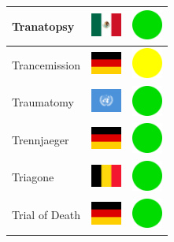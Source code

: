 \documentclass[12pt, a4paper, twoside]{report}
\begin{document}
\begin{center}
\begin{longtable}{|p{5cm}|p{2cm}|p{2cm}|}
 Tranatopsy                                                 & \includegraphics[width=1cm]{../img/flags/mx} &   \includegraphics[width=1cm]{../likes/y} \\ \hline
 Trancemission                                              & \includegraphics[width=1cm]{../img/flags/de} &   \includegraphics[width=1cm]{../likes/m} \\ \hline
 Traumatomy                                                 & \includegraphics[width=1cm]{../img/flags/un} &   \includegraphics[width=1cm]{../likes/y} \\ \hline
 Trennjaeger                                                & \includegraphics[width=1cm]{../img/flags/de} &   \includegraphics[width=1cm]{../likes/y} \\ \hline
 Triagone                                                   & \includegraphics[width=1cm]{../img/flags/be} &   \includegraphics[width=1cm]{../likes/y} \\ \hline
 Trial of Death                                             & \includegraphics[width=1cm]{../img/flags/de} &   \includegraphics[width=1cm]{../likes/y} \\ \hline

\end{longtable}
\end{center}
\end{document}
